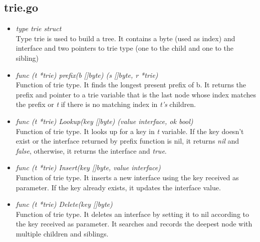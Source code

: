 \subsection{trie.go} 

\begin{itemize}

\item \emph{type trie struct}\\
Type trie is used to build a tree. It contains a byte (used as index) and interface and two pointers to trie type (one to the child and one to the sibling)

\item \emph{func (t *trie) prefix(b []byte) (s []byte, r *trie)}\\
Function of trie type. It finds the longest present prefix of b. It returns the prefix and pointer to a trie variable that is the last node whose index matches the prefix or \emph{t} if there is no matching index in \emph{t's} children.

\item \emph{func (t *trie) Lookup(key []byte) (value interface{}, ok bool)}\\
Function of trie type. It looks up for a key in \emph{t} variable. If the key doesn't exist or the interface returned by prefix function is nil, it returns \emph{nil} and \emph{false}, otherwise, it returns the interface and \emph{true}.

\item \emph{func (t *trie) Insert(key []byte, value interface{})}\\
Function of trie type. It inserts a new interface using the key received as parameter. If the key already exists, it updates the interface value.

\item \emph{func (t *trie) Delete(key []byte)}\\
Function of trie type. It deletes an interface by setting it to nil according to the key received as parameter. It searches and records the deepest node with multiple children and siblings.

\end{itemize}